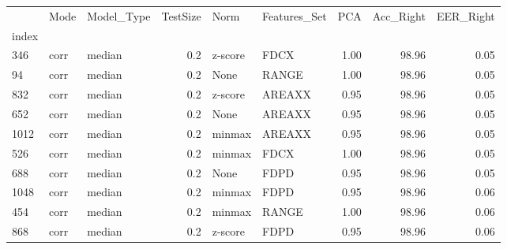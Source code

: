 \begin{tabular}{lllrllrrr}
\toprule
{} &  Mode & Model\_Type &  TestSize &     Norm & Features\_Set &   PCA &  Acc\_Right &  EER\_Right \\
index &       &            &           &          &              &       &            &            \\
\midrule
346   &  corr &     median &       0.2 &  z-score &         FDCX &  1.00 &      98.96 &       0.05 \\
94    &  corr &     median &       0.2 &     None &        RANGE &  1.00 &      98.96 &       0.05 \\
832   &  corr &     median &       0.2 &  z-score &       AREAXX &  0.95 &      98.96 &       0.05 \\
652   &  corr &     median &       0.2 &     None &       AREAXX &  0.95 &      98.96 &       0.05 \\
1012  &  corr &     median &       0.2 &   minmax &       AREAXX &  0.95 &      98.96 &       0.05 \\
526   &  corr &     median &       0.2 &   minmax &         FDCX &  1.00 &      98.96 &       0.05 \\
688   &  corr &     median &       0.2 &     None &         FDPD &  0.95 &      98.96 &       0.05 \\
1048  &  corr &     median &       0.2 &   minmax &         FDPD &  0.95 &      98.96 &       0.06 \\
454   &  corr &     median &       0.2 &   minmax &        RANGE &  1.00 &      98.96 &       0.06 \\
868   &  corr &     median &       0.2 &  z-score &         FDPD &  0.95 &      98.96 &       0.06 \\
\bottomrule
\end{tabular}
